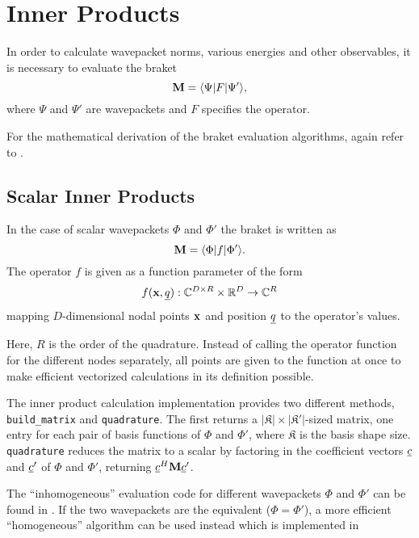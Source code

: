 \section{Inner Products}

In order to calculate wavepacket norms, various energies and other observables,
it is necessary to evaluate the braket
\begin{equation}
  \label{eq:braket}
  \mathbf{M} = \langle \Psi | F | \Psi' \rangle,
\end{equation}
where $\Psi$ and $\Psi'$ are wavepackets and $F$ specifies the operator.

For the mathematical derivation of the braket evaluation algorithms, again refer
to \cite{B_master_thesis}.


\subsection{Scalar Inner Products}

In the case of scalar wavepackets $\Phi$ and $\Phi'$ the braket is written as
\begin{equation}
  \mathbf{M} = \langle \Phi | f | \Phi' \rangle.
\end{equation}
The operator $f$ is given as a function parameter of the form
\begin{equation}
  f(\mathbf{x}, \underline{q}) : \mathbb{C}^{D \times R} \times \mathbb{R}^D \rightarrow
  \mathbb{C}^R
\end{equation}
mapping $D$-dimensional nodal points $\mathbf{x}$ and position
$\underline{q}$ to the operator's values.

Here, $R$ is the order of the quadrature.
Instead of calling the operator function for the different nodes separately, all
points are given to the function at once to make efficient vectorized
calculations in its definition possible.

The inner product calculation implementation provides two different methods,
\texttt{build\_matrix} and \texttt{quadrature}.
The first returns a $|\mathfrak{K}| \times |\mathfrak{K'}|$-sized matrix, one
entry for each pair of basis functions of $\Phi$ and $\Phi'$, where
$\mathfrak{K}$ is the basis shape size.
\texttt{quadrature} reduces the matrix to a scalar by factoring in the
coefficient vectors $\underline{c}$ and $\underline{c}'$ of $\Phi$ and $\Phi'$, returning
$\underline{c}^H \mathbf{M} \underline{c}'$.

The ``inhomogeneous'' evaluation code for different wavepackets $\Phi$ and
$\Phi'$ can be found in .
If the two wavepackets are the equivalent ($\Phi = \Phi'$), a more efficient
``homogeneous'' algorithm can be used instead which is implemented in


